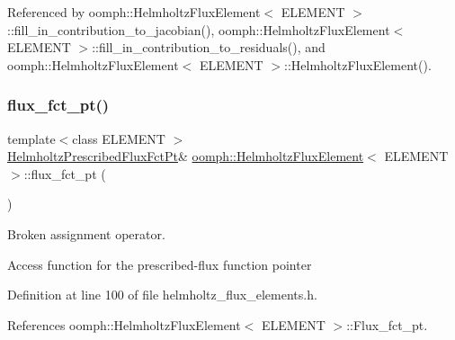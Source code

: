 Referenced by oomph\+::\+Helmholtz\+Flux\+Element$<$ E\+L\+E\+M\+E\+N\+T $>$\+::fill\+\_\+in\+\_\+contribution\+\_\+to\+\_\+jacobian(), oomph\+::\+Helmholtz\+Flux\+Element$<$ E\+L\+E\+M\+E\+N\+T $>$\+::fill\+\_\+in\+\_\+contribution\+\_\+to\+\_\+residuals(), and oomph\+::\+Helmholtz\+Flux\+Element$<$ E\+L\+E\+M\+E\+N\+T $>$\+::\+Helmholtz\+Flux\+Element().

\mbox{\label{classoomph_1_1HelmholtzFluxElement_ac2f6581b3619489d41822761038f4bf5}} 
\subsubsection{\texorpdfstring{flux\+\_\+fct\+\_\+pt()}{flux\_fct\_pt()}}
{\footnotesize\ttfamily template$<$class E\+L\+E\+M\+E\+NT $>$ \\
\hyperlink{classoomph_1_1HelmholtzFluxElement_ad53ce405c551a39ac9baeaaab7f254df}{Helmholtz\+Prescribed\+Flux\+Fct\+Pt}\& \hyperlink{classoomph_1_1HelmholtzFluxElement}{oomph\+::\+Helmholtz\+Flux\+Element}$<$ E\+L\+E\+M\+E\+NT $>$\+::flux\+\_\+fct\+\_\+pt (\begin{DoxyParamCaption}{ }\end{DoxyParamCaption})\hspace{0.3cm}{\ttfamily [inline]}}



Broken assignment operator. 

Access function for the prescribed-\/flux function pointer 

Definition at line 100 of file helmholtz\+\_\+flux\+\_\+elements.\+h.



References oomph\+::\+Helmholtz\+Flux\+Element$<$ E\+L\+E\+M\+E\+N\+T $>$\+::\+Flux\+\_\+fct\+\_\+pt.

\mbox{\label{classoomph_1_1HelmholtzFluxElement_a0e43870b7dc404d05c58c835a79e7121}} 
